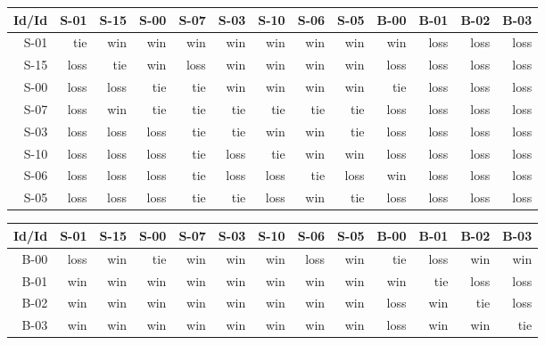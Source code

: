 \begin{tabular}{ | r | r | r | r | r | r | r | r | r | r | r | r | r | }
    \hline
        Id/Id  &   S-01  &   S-15  &   S-00  &   S-07  &   S-03  &   S-10  &   S-06  &   S-05  &   B-00  &   B-01  &   B-02  &   B-03  \\
    \hline
    \hline
         S-01  &    tie  &    win  &    win  &    win  &    win  &    win  &    win  &    win  &    win  &   loss  &   loss  &   loss  \\
    \hline
         S-15  &   loss  &    tie  &    win  &   loss  &    win  &    win  &    win  &    win  &   loss  &   loss  &   loss  &   loss  \\
    \hline
         S-00  &   loss  &   loss  &    tie  &    tie  &    win  &    win  &    win  &    win  &    tie  &   loss  &   loss  &   loss  \\
    \hline
         S-07  &   loss  &    win  &    tie  &    tie  &    tie  &    tie  &    tie  &    tie  &   loss  &   loss  &   loss  &   loss  \\
    \hline
         S-03  &   loss  &   loss  &   loss  &    tie  &    tie  &    win  &    win  &    tie  &   loss  &   loss  &   loss  &   loss  \\
    \hline
         S-10  &   loss  &   loss  &   loss  &    tie  &   loss  &    tie  &    win  &    win  &   loss  &   loss  &   loss  &   loss  \\
    \hline
         S-06  &   loss  &   loss  &   loss  &    tie  &   loss  &   loss  &    tie  &   loss  &    win  &   loss  &   loss  &   loss  \\
    \hline
         S-05  &   loss  &   loss  &   loss  &    tie  &    tie  &   loss  &    win  &    tie  &   loss  &   loss  &   loss  &   loss  \\
    \hline
\end{tabular}


\begin{tabular}{ | r | r | r | r | r | r | r | r | r | r | r | r | r | }
    \hline
        Id/Id  &   S-01  &   S-15  &   S-00  &   S-07  &   S-03  &   S-10  &   S-06  &   S-05  &   B-00  &   B-01  &   B-02  &   B-03  \\
    \hline
    \hline
         B-00  &   loss  &    win  &    tie  &    win  &    win  &    win  &   loss  &    win  &    tie  &   loss  &    win  &    win  \\
    \hline
         B-01  &    win  &    win  &    win  &    win  &    win  &    win  &    win  &    win  &    win  &    tie  &   loss  &   loss  \\
    \hline
         B-02  &    win  &    win  &    win  &    win  &    win  &    win  &    win  &    win  &   loss  &    win  &    tie  &   loss  \\
    \hline
         B-03  &    win  &    win  &    win  &    win  &    win  &    win  &    win  &    win  &   loss  &    win  &    win  &    tie  \\
    \hline
\end{tabular}


